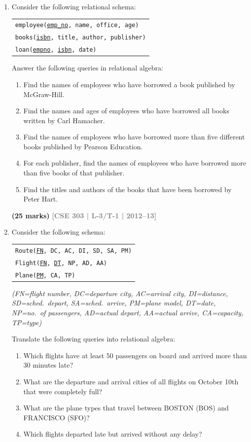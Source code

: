 \documentclass[12pt,a3paper]{article}
\newcommand{\yr}[1]{\hfill\textcolor{gray}{\small\textbf{[#1]}}}
\newcommand{\mk}[1]{\textcolor{orange!70!black}{\small\textbf{(#1 marks)}}}
\begin{document}
\begin{enumerate}
\item Consider the following relational schema:
\begin{center}
\begin{tabular}{l}
\texttt{employee(\underline{emp\_no}, name, office, age)}\\
\texttt{books(\underline{isbn}, title, author, publisher)}\\
\texttt{loan(\underline{empno}, \underline{isbn}, date)}
\end{tabular}
\end{center}
Answer the following queries in relational algebra:
\begin{enumerate}
  \item Find the names of employees who have borrowed a book published by McGraw-Hill.
  \item Find the names and ages of employees who have borrowed all books written by Carl Hamacher.
  \item Find the names of employees who have borrowed more than five different books published by Pearson Education.
  \item For each publisher, find the names of employees who have borrowed more than five books of that publisher.
  \item Find the titles and authors of the books that have been borrowed by Peter Hart.
\end{enumerate}
\mk{25} \yr{CSE 303 | L-3/T-1 | 2012--13}

\item Consider the following schema:
\begin{center}
\begin{tabular}{l}
\texttt{Route(\underline{FN}, DC, AC, DI, SD, SA, PM)}\\
\texttt{Flight(\underline{FN}, \underline{DT}, NP, AD, AA)}\\
\texttt{Plane(\underline{PM}, CA, TP)}
\end{tabular}
\end{center}
\textit{(FN=flight number, DC=departure city, AC=arrival city, DI=distance, SD=sched.\ depart, SA=sched.\ arrive, PM=plane model, DT=date, NP=no.\ of passengers, AD=actual depart, AA=actual arrive, CA=capacity, TP=type)}

Translate the following queries into relational algebra:
\begin{enumerate}
  \item Which flights have at least 50 passengers on board and arrived more than 30 minutes late?
  \item What are the departure and arrival cities of all flights on October 10th that were completely full?
  \item What are the plane types that travel between BOSTON (BOS) and FRANCISCO (SFO)?
  \item Which flights departed late but arrived without any delay?
\end{enumerate}



\end{enumerate}
\end{document}
